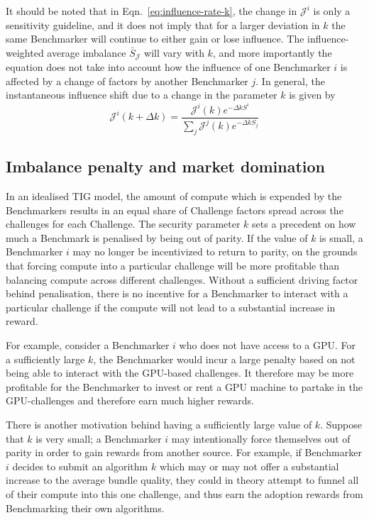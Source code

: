 It should be noted that in Eqn.~\ref{eq:influence-rate-k}, the change in $\mathcal{J}^i$ is only a sensitivity guideline, and it does not imply that for a larger deviation in $k$ the same Benchmarker will continue to either gain or lose influence. 
The influence-weighted average imbalance $\bar{S}_{\mathcal{J}}$ will vary with $k$, and more importantly the equation does not take into account how the influence of one Benchmarker $i$ is affected by a change of factors by another Benchmarker $j$. 
In general, the instantaneous influence shift due to a change in the parameter $k$ is given by 
\begin{equation}
    \mathcal{J}^i(k + \Delta k) = \frac{\mathcal{J}^i(k) e^{-\Delta k S^i}}{\sum_j \mathcal{J}^j(k)e^{-\Delta k S_j}}
\end{equation}

\subsection{Imbalance penalty and market domination}

In an idealised TIG model, the amount of compute which is expended by the Benchmarkers results in an equal share of Challenge factors spread across the challenges for each Challenge.
The security parameter $k$ sets a precedent on how much a Benchmark is penalised by being out of parity.
If the value of $k$ is small, a Benchmarker $i$ may no longer be incentivized to return to parity, on the grounds that forcing compute into a particular challenge will be more profitable than balancing compute across different challenges. 
Without a sufficient driving factor behind penalisation, there is no incentive for a Benchmarker to interact with a particular challenge if the compute will not lead to a substantial increase in reward.  

For example, consider a Benchmarker $i$ who does not have access to a GPU. 
For a sufficiently large $k$, the Benchmarker would incur a large penalty based on not being able to interact with the GPU-based challenges. 
It therefore may be more profitable for the Benchmarker to invest or rent a GPU machine to partake in the GPU-challenges and therefore earn much higher rewards.

There is another motivation behind having a sufficiently large value of $k$.
Suppose that $k$ is very small; a Benchmarker $i$ may intentionally force themselves out of parity in order to gain rewards from another source.
For example, if Benchmarker $i$ decides to submit an algorithm $k$ which may or may not offer a substantial increase to the average bundle quality, they could in theory attempt to funnel all of their compute into this one challenge, and thus earn the adoption rewards from Benchmarking their own algorithms.

